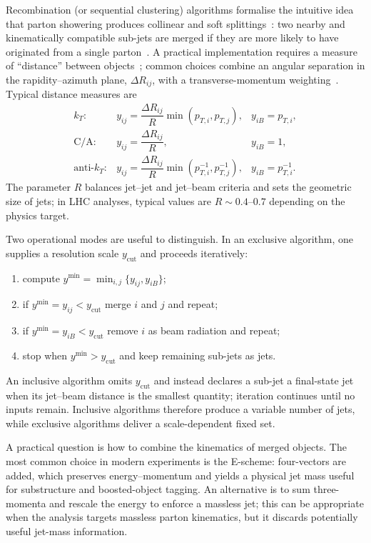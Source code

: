 Recombination (or sequential clustering) algorithms formalise the intuitive idea that parton showering produces collinear and soft splittings~\cite{dummy}: two nearby and kinematically compatible sub-jets are merged if they are more likely to have originated from a single parton~\cite{dummy}. A practical implementation requires a measure of ``distance'' between objects~\cite{dummy}; common choices combine an angular separation in the rapidity–azimuth plane, $\Delta R_{ij}$, with a transverse-momentum weighting~\cite{dummy}. Typical distance measures are~\cite{dummy}
\[
\begin{array}{lll}
k_T: & y_{ij}=\dfrac{\Delta R_{ij}}{R}\min(p_{T,i},p_{T,j}), & y_{iB}=p_{T,i},\\[6pt]
\mathrm{C/A}: & y_{ij}=\dfrac{\Delta R_{ij}}{R}, & y_{iB}=1,\\[6pt]
\text{anti-}k_T: & y_{ij}=\dfrac{\Delta R_{ij}}{R}\min(p_{T,i}^{-1},p_{T,j}^{-1}), & y_{iB}=p_{T,i}^{-1}.
\end{array}
\]
The parameter $R$ balances jet–jet and jet–beam criteria and sets the geometric size of jets; in LHC analyses, typical values are $R\sim0.4\text{--}0.7$ depending on the physics target.

Two operational modes are useful to distinguish. In an exclusive algorithm, one supplies a resolution scale $y_{\text{cut}}$ and proceeds iteratively:
\begin{enumerate}
  \item compute $y^{\min}=\min_{i,j}\{y_{ij},y_{iB}\}$;
  \item if $y^{\min}=y_{ij}<y_{\text{cut}}$ merge $i$ and $j$ and repeat;
  \item if $y^{\min}=y_{iB}<y_{\text{cut}}$ remove $i$ as beam radiation and repeat;
  \item stop when $y^{\min}>y_{\text{cut}}$ and keep remaining sub-jets as jets.
\end{enumerate}
An inclusive algorithm omits $y_{\text{cut}}$ and instead declares a sub-jet a final-state jet when its jet–beam distance is the smallest quantity; iteration continues until no inputs remain. Inclusive algorithms therefore produce a variable number of jets, while exclusive algorithms deliver a scale-dependent fixed set.

A practical question is how to combine the kinematics of merged objects. The most common choice in modern experiments is the E-scheme: four-vectors are added, which preserves energy–momentum and yields a physical jet mass useful for substructure and boosted-object tagging. An alternative is to sum three-momenta and rescale the energy to enforce a massless jet; this can be appropriate when the analysis targets massless parton kinematics, but it discards potentially useful jet-mass information.

